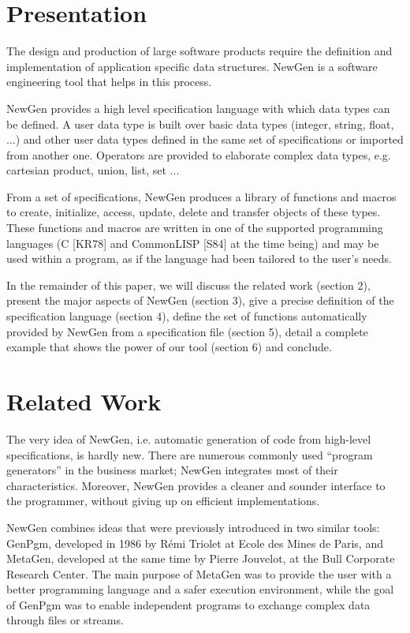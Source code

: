 \newpage

\section{Presentation}

The design and production of large software products require the
definition and implementation of application specific data structures.
NewGen is a software engineering tool that helps in this process.

NewGen provides a high level specification language with which data
types can be defined.  A user data type is built over basic data types
(integer, string, float, ...) and other user data types defined in the
same set of specifications or imported from another one. Operators
are provided to elaborate complex data types, e.g. cartesian product, union,
list, set ...

From a set of specifications, NewGen produces a library of functions and
macros to create, initialize, access, update, delete and transfer objects
of these types. These functions and macros are written in one of the
supported programming languages (C [KR78] and CommonLISP [S84] at the
time being) and may be used within a program, as if the language had
been tailored to the user's needs.

In the remainder of this paper, we will discuss the related work
(section 2), present the major aspects of NewGen (section 3), give a
precise definition of the specification language (section 4), define the
set of functions automatically provided by NewGen from a specification
file (section 5), detail a complete example that shows the power of our
tool (section 6) and conclude.

\section{Related Work}

The very idea of NewGen, i.e. automatic generation of code from
high-level specifications, is hardly new. There are numerous commonly
used ``program generators'' in the business market; NewGen integrates
most of their characteristics. Moreover, NewGen provides a cleaner and
sounder interface to the programmer, without giving up on efficient
implementations.

NewGen combines ideas that were previously introduced in two similar
tools: GenPgm, developed in 1986 by R\'emi Triolet at Ecole des Mines de
Paris, and MetaGen, developed at the same time by Pierre Jouvelot, at
the Bull Corporate Research Center. The main purpose of MetaGen was to
provide the user with a better programming language and a safer
execution environment, while the goal of GenPgm was to enable
independent programs to exchange complex data through files or streams.

